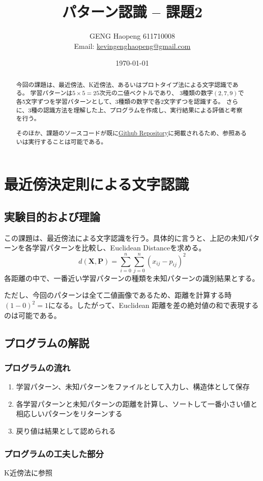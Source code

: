 \documentclass[ %
  uplatex,%
  papersize%
]{jsarticle}
\title{パターン認識 -- 課題2}
\author{\large GENG Haopeng 611710008 \\ \small Email:  \href{mailto:kevingenghaopeng@gmail.com}{kevingenghaopeng@gmail.com}}
\affil{\small Toda Laboratory, Department of Intelligent Systems, Nagoya University}
\date{\today}
\begin{document}
\maketitle

\begin{abstract}
今回の課題は、最近傍法、K近傍法、あるいはプロトタイプ法による文字認識である。
学習パターンは$5\times5=25$次元の二値ベクトルであり、
3種類の数字$(2,7,9)$で各5文字ずつを学習パターンとして、3種類の数字で各2文字ずつを認識する。
さらに、3種の認識方法を理解した上、プログラムを作成し、実行結果による評価と考察を行う。

そのほか、課題のソースコードが既に\href{https://github.com/Secondtonumb/pattern_recogn/tree/master/pattern02}{Github Repository}に掲載されるため、参照あるいは実行することは可能である。
\end{abstract}


\section{最近傍決定則による文字認識}
\subsection{実験目的および理論}
この課題は、最近傍法による文字認識を行う。具体的に言うと、上記の未知パターンを各学習パターンを比較し、Euclidean Distanceを求める。
$$d(\bm{X,P}) = \sum_{i=0}^{n}\sum_{j=0}^{n}(x_{ij} - p_{ij})^{2}$$
各距離の中で、一番近い学習パターンの種類を未知パターンの識別結果とする。

ただし、今回のパターンは全て二値画像であるため、距離を計算する時$(1-0)^{2} = 1$になる。したがって、Euclidean 距離を差の絶対値の和で表現するのは可能である。
\subsection{プログラムの解説}
\subsubsection{プログラムの流れ}
\begin{enumerate}
\small
\item 学習パターン、未知パターンをファイルとして入力し、構造体として保存
\item 各学習パターンと未知パターンの距離を計算し、ソートして一番小さい値と相応しいパターンをリターンする
\item 戻り値は結果として認められる
\end{enumerate}
\subsubsection{プログラムの工夫した部分}
K近傍法に参照
\end{document}
